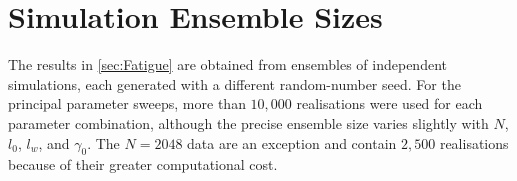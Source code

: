 \chapter{Simulation Ensemble Sizes}
\label{app:FatigueSampleCounts}

The results in \cref{sec:Fatigue} are obtained from ensembles of independent simulations, each generated with a different random-number seed. For the principal parameter sweeps, more than $10{,}000$ realisations were used for each parameter combination, although the precise ensemble size varies slightly with $N$, $l_0$, $l_w$, and $\gamma_0$. The $N=2048$ data are an exception and contain $2{,}500$ realisations because of their greater computational cost.

